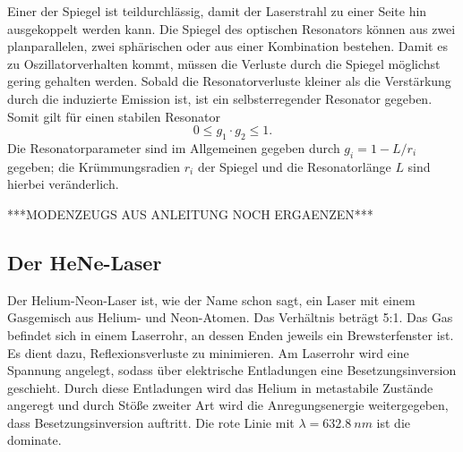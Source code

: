 Einer der Spiegel ist teildurchlässig, damit der Laserstrahl zu einer Seite hin ausgekoppelt werden kann.
Die Spiegel des optischen Resonators können aus zwei planparallelen, zwei sphärischen oder aus einer Kombination bestehen.
Damit es zu Oszillatorverhalten kommt, müssen die Verluste durch die Spiegel möglichst gering gehalten werden.
Sobald die Resonatorverluste kleiner als die Verstärkung durch die induzierte Emission ist, ist ein selbsterregender Resonator gegeben.
Somit gilt für einen stabilen Resonator
\begin{equation}
  0 \leq g_1 \cdot g_2 \leq 1.
\end{equation}
Die Resonatorparameter sind im Allgemeinen gegeben durch $g_i=1-L/r_i$ gegeben;
die Krümmungsradien $r_i$ der Spiegel und die Resonatorlänge $L$ sind hierbei veränderlich.

***MODENZEUGS AUS ANLEITUNG NOCH ERGAENZEN***
\subsection{Der HeNe-Laser}
Der Helium-Neon-Laser ist, wie der Name schon sagt, ein Laser mit einem Gasgemisch aus Helium- und Neon-Atomen.
Das Verhältnis beträgt 5:1.
Das Gas befindet sich in einem Laserrohr, an dessen Enden jeweils ein Brewsterfenster ist. Es dient dazu, Reflexionsverluste zu minimieren.
Am Laserrohr wird eine Spannung angelegt, sodass über elektrische Entladungen eine Besetzungsinversion geschieht.
Durch diese Entladungen wird das Helium in metastabile Zustände angeregt und durch Stöße zweiter Art wird die Anregungsenergie weitergegeben, dass Besetzungsinversion auftritt.
Die rote Linie mit $\lambda = \SI{632.8}{nm}$ ist die dominate.
